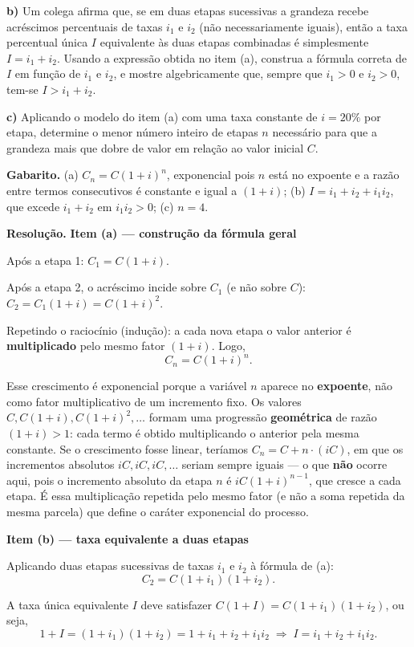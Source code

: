 \documentclass[11pt,a4paper]{article}
\begin{document}
\textbf{b)} Um colega afirma que, se em duas etapas sucessivas a grandeza recebe acréscimos percentuais de taxas $i_1$ e $i_2$ (não necessariamente iguais), então a taxa percentual única $I$ equivalente às duas etapas combinadas é simplesmente $I = i_1+i_2$. Usando a expressão obtida no item (a), construa a fórmula correta de $I$ em função de $i_1$ e $i_2$, e mostre algebricamente que, sempre que $i_1>0$ e $i_2>0$, tem-se $I > i_1+i_2$.

\textbf{c)} Aplicando o modelo do item (a) com uma taxa constante de $i=20\%$ por etapa, determine o menor número inteiro de etapas $n$ necessário para que a grandeza mais que dobre de valor em relação ao valor inicial $C$.

\textbf{Gabarito.} (a) $C_n = C(1+i)^n$, exponencial pois $n$ está no expoente e a razão entre termos consecutivos é constante e igual a $(1+i)$; (b) $I = i_1+i_2+i_1i_2$, que excede $i_1+i_2$ em $i_1i_2>0$; (c) $n=4$.

\textbf{Resolução.} \textbf{Item (a) — construção da fórmula geral}

Após a etapa 1: $C_1 = C(1+i)$.

Após a etapa 2, o acréscimo incide sobre $C_1$ (e não sobre $C$): $C_2 = C_1(1+i) = C(1+i)^2$.

Repetindo o raciocínio (indução): a cada nova etapa o valor anterior é \textbf{multiplicado} pelo mesmo fator $(1+i)$. Logo,
$$C_n = C(1+i)^n.$$

Esse crescimento é exponencial porque a variável $n$ aparece no \textbf{expoente}, não como fator multiplicativo de um incremento fixo. Os valores $C, C(1+i), C(1+i)^2, \dots$ formam uma progressão \textbf{geométrica} de razão $(1+i)>1$: cada termo é obtido multiplicando o anterior pela mesma constante. Se o crescimento fosse linear, teríamos $C_n = C + n\cdot(iC)$, em que os incrementos absolutos $iC, iC, iC,\dots$ seriam sempre iguais — o que \textbf{não} ocorre aqui, pois o incremento absoluto da etapa $n$ é $iC(1+i)^{n-1}$, que cresce a cada etapa. É essa multiplicação repetida pelo mesmo fator (e não a soma repetida da mesma parcela) que define o caráter exponencial do processo.

\textbf{Item (b) — taxa equivalente a duas etapas}

Aplicando duas etapas sucessivas de taxas $i_1$ e $i_2$ à fórmula de (a):
$$C_2 = C(1+i_1)(1+i_2).$$

A taxa única equivalente $I$ deve satisfazer $C(1+I) = C(1+i_1)(1+i_2)$, ou seja,
$$1+I = (1+i_1)(1+i_2) = 1 + i_1 + i_2 + i_1 i_2 \;\Rightarrow\; I = i_1+i_2+i_1 i_2.$$
\end{document}
